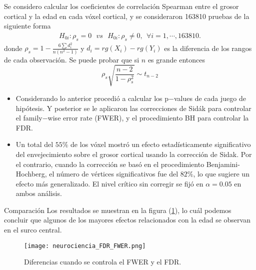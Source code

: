 \begin{frame}
    Se considero calcular los coeficientes de correlación Spearman  entre el grosor cortical y la edad en cada vóxel cortical, y se consideraron 163810 pruebas de la siguiente forma
\begin{align*}
H_{0i}: \rho_s =0 \ \ \ vs \ \ \ H_{0i}:\rho_s\neq 0, \ \ \forall i=1,\cdots, 163810.
\end{align*}
donde $\rho_s=1-\frac{6\sum d_i^2}{n(n^2-1)}$ y $d_i=rg(X_i)-rg(Y_i)$ es la diferencia de los rangos de cada observación. Se puede probar que si $n$ es grande entonces 
$$\rho_s\sqrt{\frac{n-2}{1-\rho_s^2}} \sim t_{n-2}$$
\end{frame}

\begin{frame}
    \begin{itemize}[<+- | alert@+>]
		
		\item Considerando lo anterior procedió a calcular los p$-$values de cada juego de hipótesis. Y posterior se le aplicaron las correcciones de Sidák para controlar el family$-$wise error rate (FWER), y el procedimiento BH para controlar la FDR. 
		
		\item Un total del $55\%$ de los vóxel mostró un efecto estadísticamente significativo del envejecimiento sobre el grosor cortical usando la corrección de Sidak. Por el contrario, cuando la corrección se basó en el procedimiento Benjamini-Hochberg, el número de vértices significativos fue del $82\%$, lo que sugiere un efecto más generalizado. El nivel crítico sin corregir se fijó en $\alpha = 0.05$ en ambos análisis.
	\end{itemize}
    
\end{frame}

\begin{frame}{Comparación}
Los resultados se muestran en la figura (\ref{cerebro}), lo cuál podemos concluir que algunos de los mayores efectos relacionados con la edad se observan en el surco central.
    \begin{figure}[H]
        \centering \label{cerebro}
        \texttt{[image: neurociencia\_FDR\_FWER.png]}
        \caption{Diferencias cuando se controla el FWER y el FDR.}
    \end{figure}
\end{frame}

